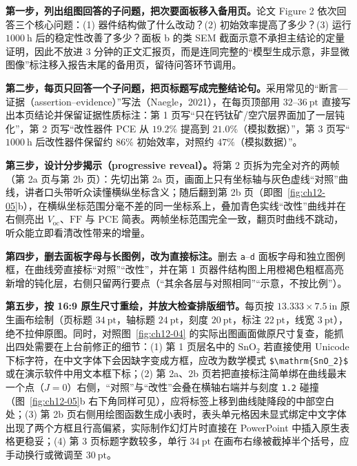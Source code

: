 \textbf{第一步，列出组图回答的子问题，把次要面板移入备用页。}论文 Figure 2 依次回答三个核心问题：(1) 器件结构做了什么改动？(2) 初始效率提高了多少？(3) 运行 $1000\ \text{h}$ 后的稳定性改善了多少？面板 b 的类 SEM 截面示意不承担主结论的定量证明，因此不放进 3 分钟的正文汇报页，而是连同完整的“模型生成示意，非显微图像”标注移入报告末尾的备用页，留待问答环节调用。

\textbf{第二步，每页只回答一个子问题，把页标题写成完整结论句。}采用常见的“断言—证据（assertion--evidence）”写法（Naegle，2021），在每页顶部用 $32\text{--}36\ \text{pt}$ 直接写出本页结论并保留证据性质标注：第 1 页写“只在钙钛矿/空穴层界面加了一层钝化”，第 2 页写“改性器件 PCE 从 $19.2\%$ 提高到 $21.0\%$（模拟数据）”，第 3 页写“$1000\ \text{h}$ 后改性器件保留约 $86\%$ 初始效率，对照约 $47\%$（模拟数据）”。

\textbf{第三步，设计分步揭示（progressive reveal）。}将第 2 页拆为完全对齐的两帧（第 2a 页与第 2b 页）：先切出第 2a 页，画面上只有坐标轴与灰色虚线“对照”曲线，讲者口头带听众读懂横纵坐标含义；随后翻到第 2b 页（即图~\ref{fig:ch12-05}b），在横纵坐标范围分毫不差的同一坐标系上，叠加青色实线“改性”曲线并在右侧亮出 $V_{\text{oc}}$、$\text{FF}$ 与 $\text{PCE}$ 简表。两帧坐标范围完全一致，翻页时曲线不跳动，听众能立即看清改性带来的增量。

\textbf{第四步，删去面板字母与长图例，改为直接标注。}删去 \texttt{a}--\texttt{d} 面板字母和独立图例框，在曲线旁直接标“对照”“改性”，并在第 1 页器件结构图上用橙褐色粗框高亮新增的钝化层，右侧只留两行要点（“其余各层与对照相同”“示意，不按比例”）。

\textbf{第五步，按 16:9 原生尺寸重绘，并放大检查排版细节。}每页按 $13.333 \times 7.5\ \text{in}$ 原生画布绘制（页标题 $34\ \text{pt}$，轴标题 $24\ \text{pt}$，刻度 $20\ \text{pt}$，标注 $22\ \text{pt}$，线宽 $3\ \text{pt}$），绝不拉伸原图。同时，对照图~\ref{fig:ch12-04} 的实际出图画面做原尺寸复查，能抓出四处需要在上台前修正的细节：(1) 第 1 页层名中的 $\text{SnO}_2$ 若直接使用 Unicode 下标字符，在中文字体下会因缺字变成方框，应改为数学模式 \texttt{\$\textbackslash mathrm\{SnO\_2\}\$} 或在演示软件中用文本框下标；(2) 第 2a、2b 页若把直接标注简单绑在曲线最末一个点（$J = 0$）右侧，“对照”与“改性”会叠在横轴右端并与刻度 \texttt{1.2} 碰撞（图~\ref{fig:ch12-05}b 右下角同样可见），应将标签上移到曲线陡降段的中部空白处；(3) 第 2b 页右侧用绘图函数生成小表时，表头单元格因未显式绑定中文字体出现了两个方框且行高偏紧，实际制作幻灯片时直接在 PowerPoint 中插入原生表格更稳妥；(4) 第 3 页标题字数较多，单行 $34\ \text{pt}$ 在画布右缘被截掉半个括号，应手动换行或微调至 $30\ \text{pt}$。

